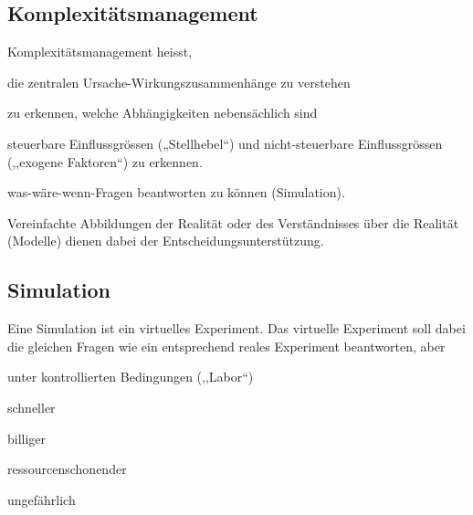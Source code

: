 \subsection{Komplexitätsmanagement}
Komplexitätsmanagement heisst,
\begin{compactitem}
	\item die zentralen Ursache-Wirkungszusammenhänge zu verstehen
	\item zu erkennen, welche Abhängigkeiten nebensächlich sind
	\item steuerbare Einflussgrössen („Stellhebel“) und nicht-steuerbare Einflussgrössen (,,exogene Faktoren``) zu erkennen.
	\item was-wäre-wenn-Fragen beantworten zu können (Simulation).
\end{compactitem}
Vereinfachte Abbildungen der Realität oder des Verständnisses über die Realität (Modelle) dienen dabei der Entscheidungsunterstützung.

\subsection{Simulation}
Eine Simulation ist ein virtuelles Experiment. Das virtuelle Experiment soll dabei die gleichen Fragen wie
ein entsprechend reales Experiment beantworten, aber
\begin{multicols}{3}
	\begin{compactitem}
		\item unter kontrollierten Bedingungen (,,Labor``)
		\item schneller
		\item billiger
		\item ressourcenschonender
		\item ungefährlich
	\end{compactitem}
\end{multicols}